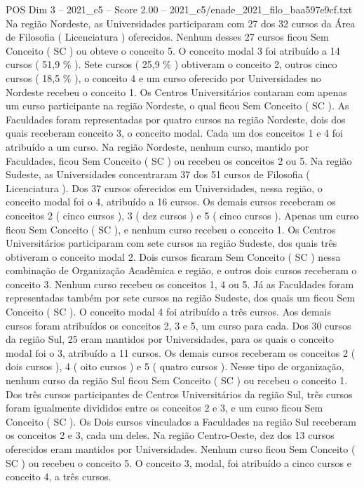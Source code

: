 \begin{textsample}{POS Dim 3 – 2021\_c5 – Score 2.00 – 2021\_c5/enade\_2021\_filo\_baa597e9cf.txt}
Na região Nordeste, as Universidades participaram com 27 dos 32 cursos da Área de Filosofia ( Licenciatura ) oferecidos.
Nenhum desses 27 cursos ficou Sem Conceito ( SC ) ou obteve o conceito 5.
O conceito modal 3 foi atribuído a 14 cursos ( 51,9 \% ).
Sete cursos ( 25,9 \% ) obtiveram o conceito 2, outros cinco cursos ( 18,5 \% ), o conceito 4 e um curso oferecido por Universidades no Nordeste recebeu o conceito 1.
Os Centros Universitários contaram com apenas um curso participante na região Nordeste, o qual ficou Sem Conceito ( SC ).
As Faculdades foram representadas por quatro cursos na região Nordeste, dois dos quais receberam conceito 3, o conceito modal.
Cada um dos conceitos 1 e 4 foi atribuído a um curso.
Na região Nordeste, nenhum curso, mantido por Faculdades, ficou Sem Conceito ( SC ) ou recebeu os conceitos 2 ou 5.
Na região Sudeste, as Universidades concentraram 37 dos 51 cursos de Filosofia ( Licenciatura ).
Dos 37 cursos oferecidos em Universidades, nessa região, o conceito modal foi o 4, atribuído a 16 cursos.
Os demais cursos receberam os conceitos 2 ( cinco cursos ), 3 ( dez cursos ) e 5 ( cinco cursos ).
Apenas um curso ficou Sem Conceito ( SC ), e nenhum curso recebeu o conceito 1.
Os Centros Universitários participaram com sete cursos na região Sudeste, dos quais três obtiveram o conceito modal 2.
Dois cursos ficaram Sem Conceito ( SC ) nessa combinação de Organização Acadêmica e região, e outros dois cursos receberam o conceito 3.
Nenhum curso recebeu os conceitos 1, 4 ou 5.
Já as Faculdades foram representadas também por sete cursos na região Sudeste, dos quais um ficou Sem Conceito ( SC ).
O conceito modal 4 foi atribuído a três cursos.
Aos demais cursos foram atribuídos os conceitos 2, 3 e 5, um curso para cada.
Dos 30 cursos da região Sul, 25 eram mantidos por Universidades, para os quais o conceito modal foi o 3, atribuído a 11 cursos.
Os demais cursos receberam os conceitos 2 ( dois cursos ), 4 ( oito cursos ) e 5 ( quatro cursos ).
Nesse tipo de organização, nenhum curso da região Sul ficou Sem Conceito ( SC ) ou recebeu o conceito 1.
Dos três cursos participantes de Centros Universitários da região Sul, três cursos foram igualmente divididos entre os conceitos 2 e 3, e um curso ficou Sem Conceito ( SC ).
Os Dois cursos vinculados a Faculdades na região Sul receberam os conceitos 2 e 3, cada um deles.
Na região Centro-Oeste, dez dos 13 cursos oferecidos eram mantidos por Universidades.
Nenhum curso ficou Sem Conceito ( SC ) ou recebeu o conceito 5.
O conceito 3, modal, foi atribuído a cinco cursos e conceito 4, a três cursos.

\end{textsample}
